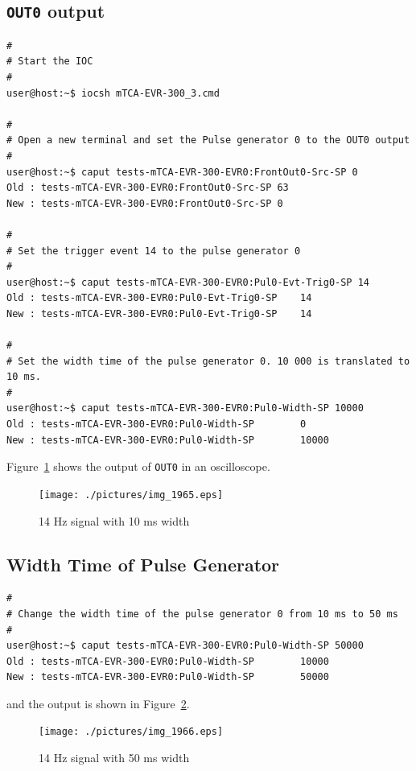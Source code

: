 \documentclass[11pt
  , a4paper
  , article
  , oneside
  , showtrims
]{memoir}
\begin{document}
\subsection{\texttt{OUT0} output}
\begin{lstlisting}[style=termstyle]
#
# Start the IOC
#
user@host:~$ iocsh mTCA-EVR-300_3.cmd

#
# Open a new terminal and set the Pulse generator 0 to the OUT0 output
# 
user@host:~$ caput tests-mTCA-EVR-300-EVR0:FrontOut0-Src-SP 0
Old : tests-mTCA-EVR-300-EVR0:FrontOut0-Src-SP 63
New : tests-mTCA-EVR-300-EVR0:FrontOut0-Src-SP 0

#
# Set the trigger event 14 to the pulse generator 0
#
user@host:~$ caput tests-mTCA-EVR-300-EVR0:Pul0-Evt-Trig0-SP 14
Old : tests-mTCA-EVR-300-EVR0:Pul0-Evt-Trig0-SP    14
New : tests-mTCA-EVR-300-EVR0:Pul0-Evt-Trig0-SP    14

#
# Set the width time of the pulse generator 0. 10 000 is translated to 10 ms.
#
user@host:~$ caput tests-mTCA-EVR-300-EVR0:Pul0-Width-SP 10000
Old : tests-mTCA-EVR-300-EVR0:Pul0-Width-SP        0
New : tests-mTCA-EVR-300-EVR0:Pul0-Width-SP        10000
\end{lstlisting}
Figure~\ref{fig:14Hz} shows the output of \texttt{OUT0} in an oscilloscope. 
\begin{figure}[!ht]
  \centering
    \texttt{[image: ./pictures/img\_1965.eps]}
  \caption{14 Hz signal with 10 ms width}
  \label{fig:14Hz}
\end{figure}


\subsection{Width Time of Pulse Generator}

\begin{lstlisting}[style=termstyle]
#
# Change the width time of the pulse generator 0 from 10 ms to 50 ms
#
user@host:~$ caput tests-mTCA-EVR-300-EVR0:Pul0-Width-SP 50000
Old : tests-mTCA-EVR-300-EVR0:Pul0-Width-SP        10000
New : tests-mTCA-EVR-300-EVR0:Pul0-Width-SP        50000  
\end{lstlisting}
and the output is shown in Figure~\ref{fig:50ms}.
\begin{figure}[!ht]
  \centering
    \texttt{[image: ./pictures/img\_1966.eps]}
  \caption{14 Hz signal with 50 ms width}
  \label{fig:50ms}
\end{figure}
\end{document}
